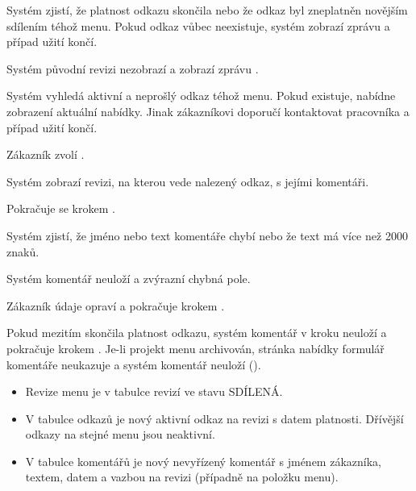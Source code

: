 \begin{ucalt}
  \item[5.1]\label{uc:11:5.1} Systém zjistí, že platnost odkazu skončila nebo že odkaz byl zneplatněn novějším sdílením téhož menu. Pokud odkaz vůbec neexistuje, systém zobrazí zprávu  a případ užití končí.
  \item[5.2]\label{uc:11:5.2} Systém původní revizi nezobrazí a zobrazí zprávu .
  \item[5.3]\label{uc:11:5.3} Systém vyhledá aktivní a neprošlý odkaz téhož menu. Pokud existuje, nabídne zobrazení aktuální nabídky. Jinak zákazníkovi doporučí kontaktovat pracovníka a případ užití končí.
  \item[5.4]\label{uc:11:5.4} Zákazník zvolí .
  \item[5.5]\label{uc:11:5.5} Systém zobrazí revizi, na kterou vede nalezený odkaz, s jejími komentáři.
  \item[5.6]\label{uc:11:5.6} Pokračuje se krokem .
\end{ucalt}

\begin{ucalt}
  \item[7.1]\label{uc:11:7.1} Systém zjistí, že jméno nebo text komentáře chybí nebo že text má více než 2000 znaků.
  \item[7.2]\label{uc:11:7.2} Systém komentář neuloží a zvýrazní chybná pole.
  \item[7.3]\label{uc:11:7.3} Zákazník údaje opraví a pokračuje krokem .
\end{ucalt}
Pokud mezitím skončila platnost odkazu, systém komentář v kroku  neuloží a pokračuje krokem . Je-li projekt menu archivován, stránka nabídky formulář komentáře neukazuje a systém komentář neuloží ().

\begin{itemize}[itemsep=0pt]
  \item Revize menu je v tabulce revizí ve stavu SDÍLENÁ.
  \item V tabulce odkazů je nový aktivní odkaz na revizi s datem platnosti. Dřívější odkazy na stejné menu jsou neaktivní.
  \item V tabulce komentářů je nový nevyřízený komentář s jménem zákazníka, textem, datem a vazbou na revizi (případně na položku menu).
\end{itemize}

